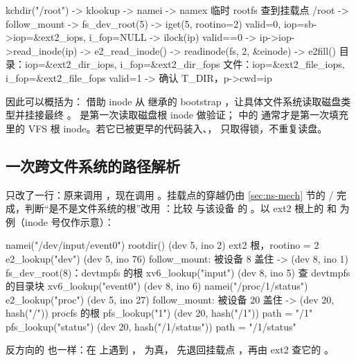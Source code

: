 \begin{txtcode}
kchdir("/root")
  -> klookup -> namei -> namex
       临时 rootfs 查到挂载点 /root
       -> follow_mount -> fs_dev_root(5) -> iget(5, rootino=2)
            valid=0, iop=sb->iop=&ext2_iops, i_fop=NULL
  -> ilock(ip)
       valid==0 -> ip->iop->read_inode(ip) -> e2_read_inode()
       -> readinode(fs, 2, &einode) -> e2fill()
            目录：iop=&ext2_dir_iops, i_fop=&ext2_dir_fops
            文件：iop=&ext2_file_iops, i_fop=&ext2_file_fops
       valid=1
  -> 确认 T_DIR，p->cwd=ip
\end{txtcode}

因此可以概括为： 借助 inode 从  继承的 bootstrap ，让具体文件系统读取磁盘类型并挂接最终 。 是第一次读取磁盘根 inode 做验证； 中的  通常才是第一次填充  里的 VFS 根 inode。若它已被更早的代码装入、， 只取得锁，不重复读盘。

\subsection{一次跨文件系统的路径解析}

 只改了一行：原来调用 ，现在调用 。挂载点的穿越仍由 \ref{sec:ns-mech} 节的 / 完成，判断“是不是文件系统的根”改用 ：比较  与该设备  的 。以 ext2 根上的  和  为例（inode 号仅作示意）：

\begin{txtcode}
namei("/dev/input/event0")
  rootdir()             (dev 5, ino 2)      ext2 根，rootino = 2
  e2_lookup("dev")      (dev 5, ino 76)     follow_mount: 被设备 8 盖住
                     -> (dev 8, ino 1)      fs_dev_root(8)：devtmpfs 的根
  xv6_lookup("input")   (dev 8, ino 5)      查 devtmpfs 的目录块
  xv6_lookup("event0")  (dev 8, ino 6)
namei("/proc/1/status")
  e2_lookup("proc")     (dev 5, ino 27)     follow_mount: 被设备 20 盖住
                     -> (dev 20, hash("/"))           procfs 的根
  pfs_lookup("1")       (dev 20, hash("/1"))          path = "/1"
  pfs_lookup("status")  (dev 20, hash("/1/status"))   path = "/1/status"
\end{txtcode}

反方向的  也一样：在  上遇到 ， 为真， 先退回挂载点 ，再由 ext2 查它的 。

